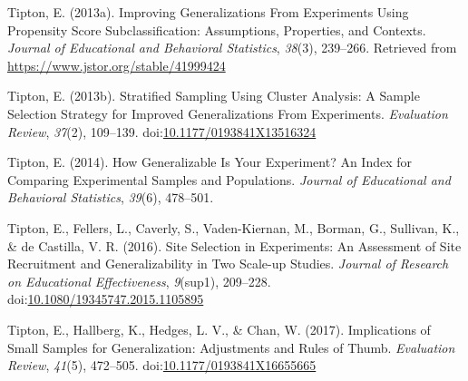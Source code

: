 \documentclass[man]{apa6}
\begin{document}
\leavevmode\hypertarget{ref-tiptonImprovingGeneralizationsExperiments2013}{}%
Tipton, E. (2013a). Improving Generalizations From Experiments Using Propensity Score Subclassification: Assumptions, Properties, and Contexts. \emph{Journal of Educational and Behavioral Statistics}, \emph{38}(3), 239--266. Retrieved from \url{https://www.jstor.org/stable/41999424}

\leavevmode\hypertarget{ref-tiptonStratifiedSamplingUsing2013}{}%
Tipton, E. (2013b). Stratified Sampling Using Cluster Analysis: A Sample Selection Strategy for Improved Generalizations From Experiments. \emph{Evaluation Review}, \emph{37}(2), 109--139. doi:\href{https://doi.org/10.1177/0193841X13516324}{10.1177/0193841X13516324}

\leavevmode\hypertarget{ref-tiptonHowGeneralizableYour2014}{}%
Tipton, E. (2014). How Generalizable Is Your Experiment? An Index for Comparing Experimental Samples and Populations. \emph{Journal of Educational and Behavioral Statistics}, \emph{39}(6), 478--501.

\leavevmode\hypertarget{ref-tiptonSiteSelectionExperiments2016}{}%
Tipton, E., Fellers, L., Caverly, S., Vaden-Kiernan, M., Borman, G., Sullivan, K., \& de Castilla, V. R. (2016). Site Selection in Experiments: An Assessment of Site Recruitment and Generalizability in Two Scale-up Studies. \emph{Journal of Research on Educational Effectiveness}, \emph{9}(sup1), 209--228. doi:\href{https://doi.org/10.1080/19345747.2015.1105895}{10.1080/19345747.2015.1105895}

\leavevmode\hypertarget{ref-tiptonImplicationsSmallSamples2017}{}%
Tipton, E., Hallberg, K., Hedges, L. V., \& Chan, W. (2017). Implications of Small Samples for Generalization: Adjustments and Rules of Thumb. \emph{Evaluation Review}, \emph{41}(5), 472--505. doi:\href{https://doi.org/10.1177/0193841X16655665}{10.1177/0193841X16655665}

\endgroup
\end{document}
